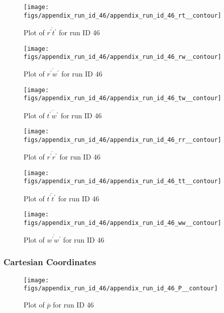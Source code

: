 \begin{figure}[H]
\centering
\texttt{[image: figs/appendix\_run\_id\_46/appendix\_run\_id\_46\_rt\_\_contour]}
\caption{Plot of $\overline{r^\prime t^\prime}$ for run ID 46}
\label{fig:appendix_run_id_46_rt__contour}
\end{figure}


\begin{figure}[H]
\centering
\texttt{[image: figs/appendix\_run\_id\_46/appendix\_run\_id\_46\_rw\_\_contour]}
\caption{Plot of $\overline{r^\prime w^\prime}$ for run ID 46}
\label{fig:appendix_run_id_46_rw__contour}
\end{figure}


\begin{figure}[H]
\centering
\texttt{[image: figs/appendix\_run\_id\_46/appendix\_run\_id\_46\_tw\_\_contour]}
\caption{Plot of $\overline{t^\prime w^\prime}$ for run ID 46}
\label{fig:appendix_run_id_46_tw__contour}
\end{figure}


\begin{figure}[H]
\centering
\texttt{[image: figs/appendix\_run\_id\_46/appendix\_run\_id\_46\_rr\_\_contour]}
\caption{Plot of $\overline{r^\prime r^\prime}$ for run ID 46}
\label{fig:appendix_run_id_46_rr__contour}
\end{figure}


\begin{figure}[H]
\centering
\texttt{[image: figs/appendix\_run\_id\_46/appendix\_run\_id\_46\_tt\_\_contour]}
\caption{Plot of $\overline{t^\prime t^\prime}$ for run ID 46}
\label{fig:appendix_run_id_46_tt__contour}
\end{figure}


\begin{figure}[H]
\centering
\texttt{[image: figs/appendix\_run\_id\_46/appendix\_run\_id\_46\_ww\_\_contour]}
\caption{Plot of $\overline{w^\prime w^\prime}$ for run ID 46}
\label{fig:appendix_run_id_46_ww__contour}
\end{figure}


\subsubsection{Cartesian Coordinates}
\begin{figure}[H]
\centering
\texttt{[image: figs/appendix\_run\_id\_46/appendix\_run\_id\_46\_P\_\_contour]}
\caption{Plot of $\overline{p}$ for run ID 46}
\label{fig:appendix_run_id_46_P__contour}
\end{figure}


